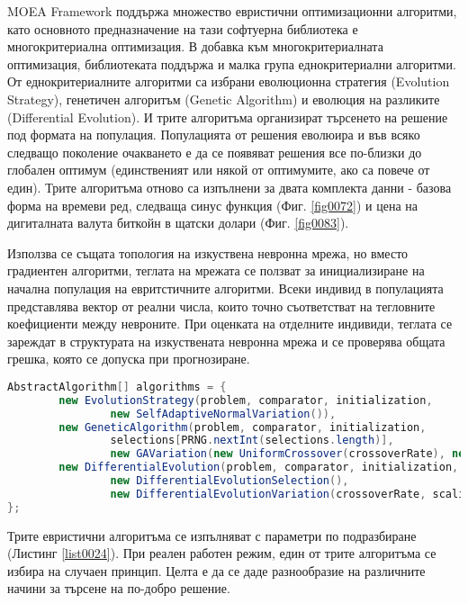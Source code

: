 MOEA Framework поддържа множество евристични оптимизационни алгоритми, като основното предназначение на тази софтуерна библиотека е многокритериална оптимизация. В добавка към многокритериалната оптимизация, библиотеката поддържа и малка група еднокритериални алгоритми. От еднокритериалните алгоритми са избрани еволюционна стратегия (Evolution Strategy), генетичен алгоритъм (Genetic Algorithm) и еволюция на разликите (Differential Evolution). И трите алгоритъма организират търсенето на решение под формата на популация. Популацията от решения еволюира и във всяко следващо поколение очакването е да се появяват решения все по-близки до глобален оптимум (единственият или някой от оптимумите, ако са повече от един). Трите алгоритъма отново са изпълнени за двата комплекта данни - базова форма на времеви ред, следваща синус функция (Фиг. \ref{fig0072}) и цена на дигиталната валута биткойн в щатски долари (Фиг. \ref{fig0083}).

Използва се същата топология на изкуствена невронна мрежа, но вместо градиентен алгоритми, теглата на мрежата се ползват за инициализиране на начална популация на евритстичните алгоритми. Всеки индивид в популацията представлява вектор от реални числа, които точно съответстват на тегловните коефициенти между невроните. При оценката на отделните индивиди, теглата се зареждат в структурата на изкуствената невронна мрежа и се проверява общата грешка, която се допуска при прогнозиране. 

\begin{lstlisting}[caption=Евристични алгоритми, language=Java, basicstyle=\tiny, label=list0024]
AbstractAlgorithm[] algorithms = {
        new EvolutionStrategy(problem, comparator, initialization,
                new SelfAdaptiveNormalVariation()),
        new GeneticAlgorithm(problem, comparator, initialization,
                selections[PRNG.nextInt(selections.length)],
                new GAVariation(new UniformCrossover(crossoverRate), new Insertion(mutationRate))),
        new DifferentialEvolution(problem, comparator, initialization,
                new DifferentialEvolutionSelection(),
                new DifferentialEvolutionVariation(crossoverRate, scalingFactor))
};
\end{lstlisting}

Трите евристични алгоритъма се изпълняват с параметри по подразбиране (Листинг \ref{list0024}). При реален работен режим, един от трите алгоритъма се избира на случаен принцип. Целта е да се даде разнообразие на различните начини за търсене на  по-добро решение. 

